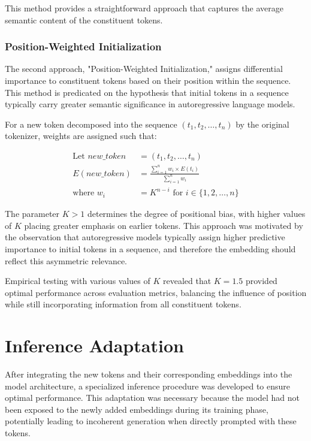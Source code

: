 This method provides a straightforward approach that captures the average semantic content of the constituent tokens.

\subsubsection{Position-Weighted Initialization}
The second approach, "Position-Weighted Initialization," assigns differential importance to constituent tokens based on their position within the sequence. This method is predicated on the hypothesis that initial tokens in a sequence typically carry greater semantic significance in autoregressive language models.

For a new token decomposed into the sequence $(t_1, t_2, \ldots, t_n)$ by the original tokenizer, weights are assigned such that:

$$
\begin{aligned}
\text{Let } new\_token &= (t_1, t_2, \ldots, t_n) \\
E(new\_token) &= \frac{\sum_{i=1}^{n} w_i \times E(t_i)}{\sum_{i=1}^{n} w_i} \\
\text{where } w_i &= K^{n-i} \text{ for } i \in \{1,2,\ldots,n\}
\end{aligned}
$$

The parameter $K > 1$ determines the degree of positional bias, with higher values of $K$ placing greater emphasis on earlier tokens. This approach was motivated by the observation that autoregressive models typically assign higher predictive importance to initial tokens in a sequence, and therefore the embedding should reflect this asymmetric relevance.

Empirical testing with various values of $K$ revealed that $K = 1.5$ provided optimal performance across evaluation metrics, balancing the influence of position while still incorporating information from all constituent tokens.

\section{Inference Adaptation}
After integrating the new tokens and their corresponding embeddings into the model architecture, a specialized inference procedure was developed to ensure optimal performance. This adaptation was necessary because the model had not been exposed to the newly added embeddings during its training phase, potentially leading to incoherent generation when directly prompted with these tokens.

